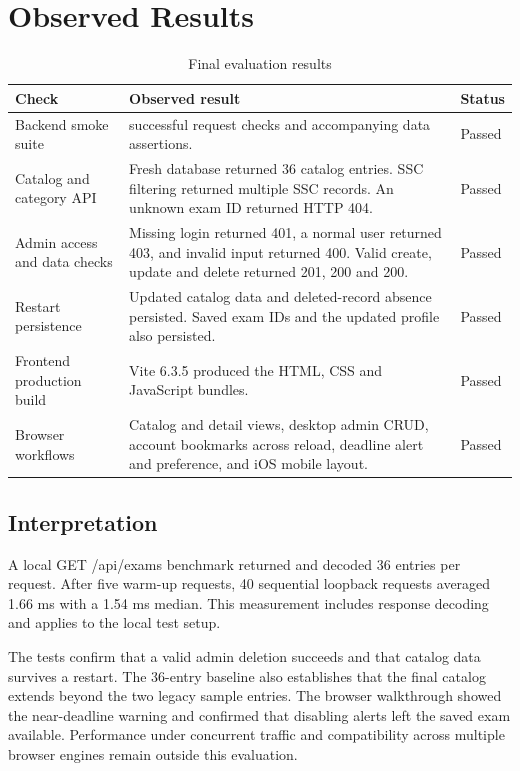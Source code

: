 \documentclass[12pt,a4paper]{report}
\begin{document}
\section{Observed Results}

\begin{table}[H]
\centering\small
\begin{tabular}{>{\raggedright\arraybackslash}p{}>{\raggedright\arraybackslash}p{}>{\raggedright\arraybackslash}p{}}
\toprule
\textbf{Check} & \textbf{Observed result} & \textbf{Status} \\ \midrule
Backend smoke suite & 31 successful request checks and accompanying data assertions. & Passed \\
Catalog and category API & Fresh database returned 36 catalog entries. SSC filtering returned multiple SSC records. An unknown exam ID returned HTTP 404. & Passed \\
Admin access and data checks & Missing login returned 401, a normal user returned 403, and invalid input returned 400. Valid create, update and delete returned 201, 200 and 200. & Passed \\
Restart persistence & Updated catalog data and deleted-record absence persisted. Saved exam IDs and the updated profile also persisted. & Passed \\
Frontend production build & Vite 6.3.5 produced the HTML, CSS and JavaScript bundles. & Passed \\
Browser workflows & Catalog and detail views, desktop admin CRUD, account bookmarks across reload, deadline alert and preference, and iOS mobile layout. & Passed \\
\bottomrule
\end{tabular}
\setcounter{table}{0}
\caption{Final evaluation results}
\end{table}

\clearpage

\subsection{Interpretation}

A local GET /api/exams benchmark returned and decoded 36 entries per request. After five warm-up requests, 40 sequential loopback requests averaged 1.66 ms with a 1.54 ms median. This measurement includes response decoding and applies to the local test setup.


The tests confirm that a valid admin deletion succeeds and that catalog data survives a restart. The 36-entry baseline also establishes that the final catalog extends beyond the two legacy sample entries. The browser walkthrough showed the near-deadline warning and confirmed that disabling alerts left the saved exam available. Performance under concurrent traffic and compatibility across multiple browser engines remain outside this evaluation.
\end{document}
